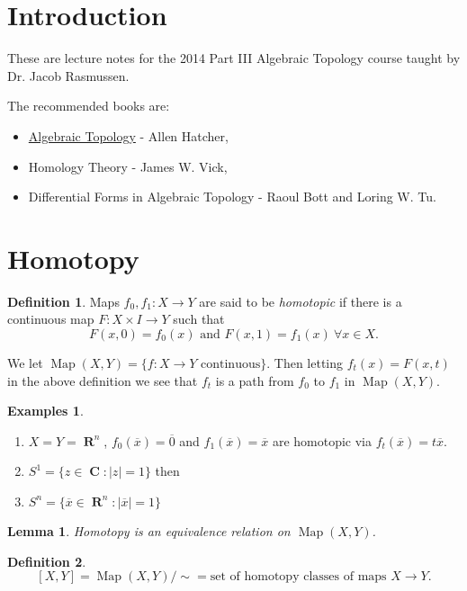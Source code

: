 \documentclass{article}
\newtheorem*{lem}{Lemma}
\theoremstyle{definition}
\newtheorem*{defn}{Definition}
\newtheorem*{exs}{Examples}
\DeclareMathOperator{\Map}{Map}
\DeclareMathOperator{\RR}{\mathbf{R}}
\DeclareMathOperator{\CC}{\mathbf{C}}
\begin{document}
\maketitle
\tableofcontents

\section{Introduction}
These are lecture notes for the 2014 Part III Algebraic Topology course taught by Dr. Jacob Rasmussen.


The recommended books are:
\begin{itemize}
\item \href{http://www.math.cornell.edu/~hatcher/AT/ATpage.html}{Algebraic Topology} - Allen Hatcher,%
\item Homology Theory - James W. Vick,
\item Differential Forms in Algebraic Topology - Raoul Bott and Loring W. Tu.
\end{itemize}
\clearpage

\section{Homotopy}

\begin{defn}
Maps $f_0,f_1\colon X \to Y$ are said to be \emph{homotopic} if there is a continuous map $F\colon X\times I \to Y$ such that
\[
F(x,0) = f_0(x)\text{ and }F(x,1) = f_1(x)\ \forall x\in X.
\]
\end{defn}

We let $\Map(X,Y) = \{f\colon X \to Y \text{ continuous}\}$.
Then letting $f_t(x) = F(x,t)$ in the above definition we see that $f_t$ is a path from $f_0$ to $f_1$ in $\Map(X,Y)$.

\begin{exs}
\begin{enumerate}
\item $X = Y = \RR^n$, $f_0(\overline{x}) = \overline{0}$ and $f_1(\overline{x}) = \overline{x}$ are homotopic via $f_t(\overline{x}) = t\overline{x}$.
\item $S^1 = \{z\in \CC : |z| = 1\}$ then %
\item $S^n = \{ \overline{x} \in \RR^n : |\overline{x}| = 1\}$ %
\end{enumerate}
\end{exs}

\begin{lem}
Homotopy is an equivalence relation on $\Map(X,Y)$.
\end{lem}
\begin{defn}
\[
[X,Y] = \Map(X,Y)/\sim = \text{set of homotopy classes of maps } X \to Y.
\]
\end{defn}
\end{document}
